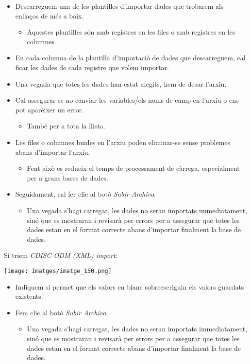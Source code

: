 \documentclass[
]{article}
\providecommand{\tightlist}{%
  \setlength{\itemsep}{0pt}\setlength{\parskip}{0pt}}
\begin{document}
\begin{itemize}
\tightlist
\item
  Descarreguem una de les plantilles d'importar dades que trobarem als enllaços de més a baix.

  \begin{itemize}
  \tightlist
  \item
    Aquestes plantilles són amb registres en les files o amb registres en les columnes.
  \end{itemize}
\item
  En cada columna de la plantilla d'importació de dades que descarreguem, cal ficar les dades de cada registre que volem importar.
\item
  Una vegada que totes les dades han estat afegits, hem de desar l'arxiu.
\item
  Cal assegurar-se no canviar les variables/els noms de camp en l'arxiu o ens pot aparèixer un error.

  \begin{itemize}
  \tightlist
  \item
    També per a tota la llista.
  \end{itemize}
\item
  Les files o columnes buides en l'arxiu poden eliminar-se sense problemes abans d'importar l'arxiu.

  \begin{itemize}
  \tightlist
  \item
    Fent això es redueix el temps de processament de càrrega, especialment per a grans bases de dades.
  \end{itemize}
\item
  Seguidament, cal fer clic al botó \emph{Subir Archivo}.

  \begin{itemize}
  \tightlist
  \item
    Una vegada s'hagi carregat, les dades no seran importats immediatament, sinó que es mostraran i revisarà per errors per a assegurar que totes les dades estan en el format correcte abans d'importar finalment la base de dades.
  \end{itemize}
\end{itemize}

Si triem \emph{CDISC ODM (XML) import}:

\texttt{[image: Imatges/imatge\_150.png]}

\begin{itemize}
\tightlist
\item
  Indiquem si permet que els valors en blanc sobreescriguin els valors guardats existents.
\item
  Fem clic al botó \emph{Subir Archivo}.

  \begin{itemize}
  \tightlist
  \item
    Una vegada s'hagi carregat, les dades no seran importats immediatament, sinó que es mostraran i revisarà per errors per a assegurar que totes les dades estan en el format correcte abans d'importar finalment la base de dades.
  \end{itemize}
\end{itemize}
\end{document}
